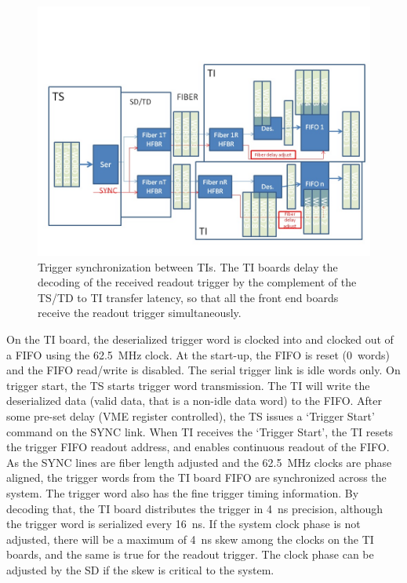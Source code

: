 \begin{figure}[hbt]
	\centering
	\includegraphics[width=1.0\columnwidth,keepaspectratio]{img/TrgSync.jpg}
	\caption{Trigger synchronization between TIs.  The TI boards delay the decoding of the received readout trigger by the complement of the TS/TD to TI transfer latency, so that all the front end boards receive the readout trigger simultaneously.}
	\label{fig:TIsync}
\end{figure}

On the TI board, the deserialized trigger word is clocked into and clocked out of a FIFO using the 62.5~MHz clock.  At the start-up, the FIFO is reset (0~words) and the FIFO read/write is disabled.  The serial trigger link is idle words only.  On trigger start, the TS starts trigger word transmission.  The TI will write the deserialized data (valid data, that is a non-idle data word) to the FIFO.  After some pre-set delay (VME register controlled), the TS issues a ‘Trigger Start’ command on the SYNC link.  When TI receives the ‘Trigger Start’, the TI resets the trigger FIFO readout address, and enables continuous readout of the FIFO.  As the SYNC lines are fiber length adjusted and the 62.5~MHz clocks are phase aligned, the trigger words from the TI board FIFO are synchronized across the system.
The trigger word also has the fine trigger timing information.  By decoding that, the TI board distributes the trigger in 4~ns precision, although the trigger word is serialized every 16~ns.  If the system clock phase is not adjusted, there will be a maximum of 4~ns skew among the clocks on the TI boards, and the same is true for the readout trigger.  The clock phase can be adjusted by the SD if the skew is critical to the system.


